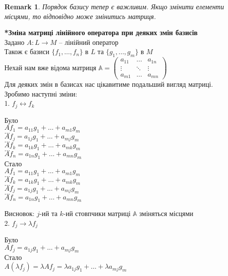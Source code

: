 \documentclass[a4paper, 10pt]{article}
\theoremstyle{theoremdd}
\newtheorem{remark}[theorem]{Remark}
\begin{document}
	\begin{remark}
	Порядок базису тепер є важливим. Якщо змінити елементи місцями, то відповідно може змінитись матриця.
	\end{remark}
	\iffalse
	\textbf{*Зміна матриці лінійного оператора при деяких змін базисів}\\
	Задано $A: L \to M$ -- лінійний оператор \\ Також є базиси $\{f_1,\dots,f_n\}$ в $L$ та $\{g_1,\dots,g_m\}$ в $M$\\
	Нехай нам вже відома матриця $\mathbb{A} = \begin{pmatrix}
	a_{11} & \dots & a_{1n} \\
	\vdots & \ddots & \vdots \\
	a_{m1} & \dots & a_{mn}
	\end{pmatrix}$\\
	Для деяких змін в базисах нас цікавитиме подальший вигляд матриці.\\
	Зробимо наступні зміни:
	\bigskip \\
	1. $f_j \longleftrightarrow f_k$
\multicolsep=0pt
	\begin{multicols}{2}
	Було \\
$Af_1 = a_{11}g_1 + \dots + a_{m1}g_m$ \\
$\dots$ \\
$Af_j = a_{1j}g_1 + \dots + a_{mj}g_m$ \\
$\dots$ \\
$Af_k = a_{1k}g_1 + \dots + a_{mk}g_m$ \\
$\dots$ \\
$Af_n = a_{1n}g_1 + \dots + a_{mn}g_m$
	\columnbreak
	\\
	Стало \\
$Af_1 = a_{11}g_1 + \dots + a_{m1}g_m$ \\
$\dots$ \\
$Af_k = a_{1k}g_1 + \dots + a_{mk}g_m$\\
$\dots$ \\
$Af_j = a_{1j}g_1 + \dots + a_{mj}g_m$\\
$\dots$ \\
$Af_n = a_{1n}g_1 + \dots + a_{mn}g_m$
	\end{multicols}
	Висновок: $j$-ий та $k$-ий стовпчики матриці $\mathbb{A}$ зміняться місцями
	\bigskip \\
	2. $f_j \rightarrow \lambda f_j$
\multicolsep=0pt
	\begin{multicols}{2}
	Було \\
$Af_j = a_{1j}g_1 + \dots + a_{mj}g_m$
	\columnbreak
	\\
	Стало \\
$A(\lambda f_j) = \lambda Af_j = \lambda a_{1j}g_1 + \dots + \lambda a_{mj}g_m$
	\end{multicols}
\end{document}
